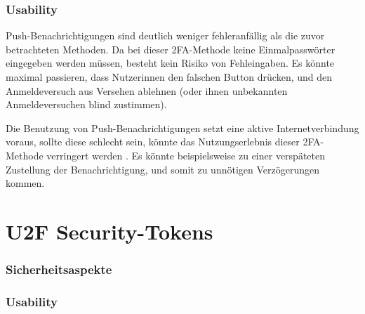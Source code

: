 \subsubsection{Usability}

Push-Benachrichtigungen sind deutlich weniger fehleranfällig als die zuvor betrachteten Methoden. Da bei dieser \ac{2FA}-Methode keine Einmalpasswörter eingegeben werden müssen, besteht kein Risiko von Fehleingaben. Es könnte maximal passieren, dass Nutzerinnen den falschen Button drücken, und den Anmeldeversuch aus Versehen ablehnen (oder ihnen unbekannten Anmeldeversuchen blind zustimmen).

Die Benutzung von Push-Benachrichtigungen setzt eine aktive Internetverbindung voraus, sollte diese schlecht sein, könnte das Nutzungserlebnis dieser \ac{2FA}-Methode verringert werden \parencite{reeseUsabilityStudy2019}. Es könnte beispielsweise zu einer verspäteten Zustellung der Benachrichtigung, und somit zu unnötigen Verzögerungen kommen.

\section{U2F Security-Tokens}
\subsubsection{Sicherheitsaspekte}
\subsubsection{Usability}
